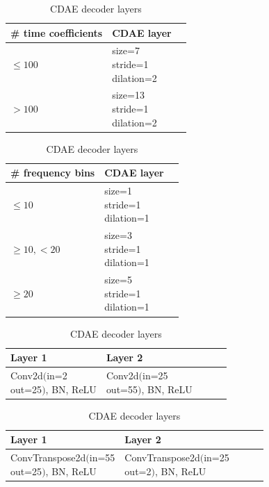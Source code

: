 \documentclass[report.tex]{subfiles}
\begin{document}
\begin{table}[ht]
	\centering
	\caption{Kernel parameters, time dimension}
	\label{table:convtable1}
	\begin{tabular}{ |l|l|l| }
	 \hline
		\# time coefficients & CDAE layer \\
	 \hline
	 \hline
		$\le 100$ & \makecell[l]{size=7\\stride=1\\dilation=2} \\
	 \hline
		$> 100$ & \makecell[l]{size=13\\stride=1\\dilation=2} \\
	 \hline
\end{tabular}
	\vspace{1em}
	\caption{Kernel parameters, frequency dimension}
	\label{table:convtable2}
\begin{tabular}{ |l|l|l| }
	 \hline
		\# frequency bins & CDAE layer \\
	 \hline
	 \hline
		$\le 10$ & \makecell[l]{size=1\\stride=1\\dilation=1} \\
	 \hline
		$\ge 10, < 20$ & \makecell[l]{size=3\\stride=1\\dilation=1} \\
	 \hline
		$\ge 20$ & \makecell[l]{size=5\\stride=1\\dilation=1} \\
	 \hline
\end{tabular}
	\vspace{1em}
	\caption{CDAE encoder layers}
	\label{table:convtable3}
\begin{tabular}{ |l|l|l|l|l| }
	 \hline
		Layer 1 & Layer 2 \\
	 \hline
	 \hline
		Conv2d$\Big($\makecell[l]{in=2\\out=25}$\Big)$, BN, ReLU & Conv2d$\Big($\makecell[l]{in=25\\out=55}$\Big)$, BN, ReLU \\
	 \hline
\end{tabular}
	\vspace{1em}
	\caption{CDAE decoder layers}
	\label{table:convtable4}
\begin{tabular}{ |l|l|l|l|l| }
	 \hline
		Layer 1 & Layer 2 \\
	 \hline
	 \hline
		ConvTranspose2d$\Big($\makecell[l]{in=55\\out=25}$\Big)$, BN, ReLU & ConvTranspose2d$\Big($\makecell[l]{in=25\\out=2}$\Big)$, BN, ReLU \\
	 \hline
\end{tabular}
\end{table}
\end{document}
